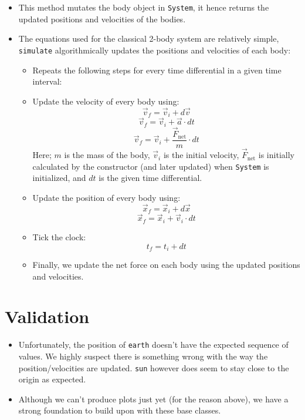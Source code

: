 \documentclass[hidelinks, 11pt]{article}
\newcommand{\psubsection}[1]{
    \noindent 
    \section*{#1}
}
\begin{document}
    \begin{itemize}
        \item This method mutates the body object in \texttt{System}, it hence returns the updated positions and velocities of the bodies.
        \item The equations used for the classical 2-body system are relatively simple, \texttt{simulate} algorithmically updates the positions and velocities of each body:
        \begin{itemize}
            \item Repeats the following steps for every time differential in a given time interval:
            \item Update the velocity of every body using:
            \[ \vec{v}_f = \vec{v}_i + d\vec{v} \]
            \[ \vec{v}_f = \vec{v}_i + \vec{a} \cdot dt \]
            \[ \vec{v}_f = \vec{v}_i + \frac{\vec{F}_\text{net}}{m} \cdot dt \]
            Here; $m$ is the mass of the body, $\vec{v}_i$ is the initial velocity, $\vec{F}_\text{net}$ is initially calculated by the constructor (and later updated) when \texttt{System} is initialized, and $dt$ is the given time differential.
            \item Update the position of every body using:
            \[ \vec{x}_f = \vec{x}_i + d\vec{x} \]
            \[ \vec{x}_f = \vec{x}_i + \vec{v}_i \cdot dt \]
            \item Tick the clock:
            \[ t_f = t_i + dt \]
            \item Finally, we update the net force on each body using the updated positions and velocities.
        \end{itemize}
    \end{itemize}

    \psubsection{Validation}

    \begin{itemize}
        \item Unfortunately, the position of \texttt{earth} doesn't have the expected sequence of values. We highly suspect there is something wrong with the way the position/velocities are updated. \texttt{sun} however does seem to stay close to the origin as expected.
        \item Although we can't produce plots just yet (for the reason above), we have a strong foundation to build upon with these base classes.
    \end{itemize}
\end{document}
